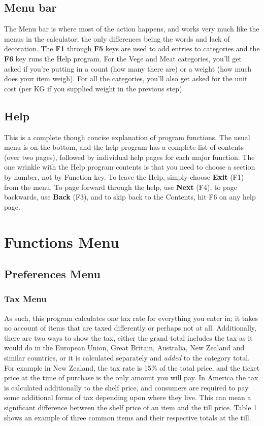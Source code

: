 \documentclass[]{article}
\begin{document}
\subsection{Menu bar}
The Menu bar is where most of the action happens, and works very much like the menus
in the calculator; the only differences being the words and lack of decoration.
The {\bf F1} through {\bf F5} keys are used to add entries to categories %
and the  {\bf F6} key runs the Help program. For the Vege and Meat categories,
you'll get asked if you're putting in a count (how many there are) or a weight (how
much does your item weigh). For all the categories, you'll also get asked for the
unit cost (per KG if you supplied weight in the previous step).
\subsection{Help}
This is a complete though concise explanation of program functions. The usual menu
is on the bottom, and the help program has a complete list of contents (over two pages),
followed by individual help pages for each major function. The one wrinkle with the
Help program contents is that you need to choose a section by number, not by Function key.
To leave the Help, simply choose {\bf Exit} (F1) from the menu. To page forward through
the help, use {\bf Next} (F4), to page backwards, use {\bf Back} (F3), and to skip back
to the Contents, hit F6 on any help page.
\section[Functions]{Functions Menu}
\subsection[Preferences]{Preferences Menu}

\subsubsection[Tax]{Tax Menu}
As such, this program calculates one tax rate for everything you enter in; it takes no
account of items that are taxed differently or perhaps not at all. Additionally, there
are two ways to show the tax, either the grand total includes the tax as it would do in
the European Union, Great Britain, Australia, New Zealand and similar countries, or it
is calculated separately and {\it added} to the category total. For example in New Zealand,
the tax rate is 15\% of the total price, and the ticket price at the time of purchase is
the only amount you will pay. In America the tax is calculated additionally to the shelf
price, and consumers are required to pay some additional forms of tax depending upon where
they live. This can mean a significant difference between the shelf price of an item and
the till price. Table 1 shows an example of three common items and their respective
totals at the till.
\end{document}
